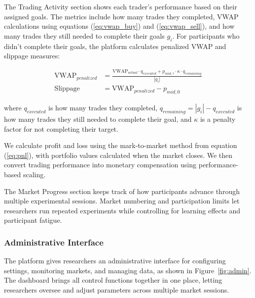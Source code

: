 The Trading Activity section shows each trader's performance based on their assigned goals. The metrics include how many trades they completed, VWAP calculations using equations (\ref{eq:vwap_buy}) and (\ref{eq:vwap_sell}), and how many trades they still needed to complete their goals $g_i$. For participants who didn't complete their goals, the platform calculates penalized VWAP and slippage measures:

\begin{align}
\text{VWAP}_{penalized} &= \frac{\text{VWAP}_{actual} \cdot q_{executed} + p_{mid,\tau} \cdot \kappa \cdot q_{remaining}}{|g_i|} \label{eq:vwap_penalized}\\
\text{Slippage} &= \text{VWAP}_{penalized} - p_{mid,0} \label{eq:slippage}
\end{align}

where $q_{executed}$ is how many trades they completed, $q_{remaining} = |g_i| - q_{executed}$ is how many trades they still needed to complete their goal, and $\kappa$ is a penalty factor for not completing their target.

We calculate profit and loss using the mark-to-market method from equation (\ref{eq:pnl}), with portfolio values calculated when the market closes. We then convert trading performance into monetary compensation using performance-based scaling.

The Market Progress section keeps track of how participants advance through multiple experimental sessions. Market numbering and participation limits let researchers run repeated experiments while controlling for learning effects and participant fatigue.

\subsubsection{Administrative Interface}

The platform gives researchers an administrative interface for configuring settings, monitoring markets, and managing data, as shown in Figure~\ref{fig:admin}. The dashboard brings all control functions together in one place, letting researchers oversee and adjust parameters across multiple market sessions.

